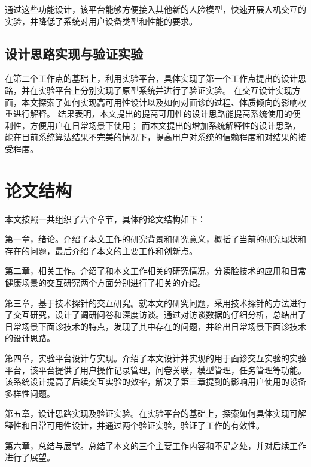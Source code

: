 通过这些功能设计，该平台能够方便接入其他新的人脸模型，快速开展人机交互的实验，并降低了系统对用户设备类型和性能的要求。


\subsection{设计思路实现与验证实验}


在第二个工作点的基础上，利用实验平台，具体实现了第一个工作点提出的设计思路，并在实验平台上分别实现了原型系统并进行了验证实验。
在交互设计实现方面，本文探索了如何实现高可用性设计以及如何对面诊的过程、体质倾向的影响权重进行解释。
结果表明，本文提出的提高可用性的设计思路能提高系统使用的便利性，方便用户在日常场景下使用；
而本文提出的增加系统解释性的设计思路，能在目前系统算法结果不完美的情况下，提高用户对系统的信赖程度和对结果的接受程度。


\section{论文结构}
本文按照一共组织了六个章节，具体的论文结构如下：

第一章，绪论。介绍了本文工作的研究背景和研究意义，概括了当前的研究现状和存在的问题，最后介绍了本文的主要工作和创新点。

第二章，相关工作。介绍了和本文工作相关的研究情况，分读脸技术的应用和日常健康场景的交互研究两个方面分别进行了相关的介绍。

第三章，基于技术探针的交互研究。就本文的研究问题，采用技术探针的方法进行了交互研究，设计了调研问卷和深度访谈。通过对访谈数据的仔细分析，总结出了日常场景下面诊技术的特点，发现了其中存在的问题，并给出日常场景下面诊技术的设计思路。

第四章，实验平台设计与实现。介绍了本文设计并实现的用于面诊交互实验的实验平台，该平台提供了用户操作记录管理，问卷关联，模型管理，任务管理等功能。该系统设计提高了后续交互实验的效率，解决了第三章提到的影响用户使用的设备多样性问题。

第五章，设计思路实现及验证实验。在实验平台的基础上，探索如何具体实现可解释性和日常可用性设计，并通过两个验证实验，验证了工作的有效性。

第六章，总结与展望。总结了本文的三个主要工作内容和不足之处，并对后续工作进行了展望。